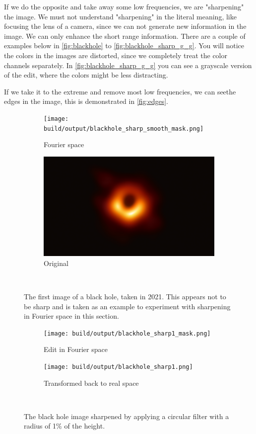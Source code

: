 \FloatBarrier

If we do the opposite and take away some low frequencies, we are "sharpening" the image.
We must not understand "sharpening" in the literal meaning, like focusing the lens of a camera,
since we can not generate new information in the image. We can only enhance the short range information.
There are a couple of examples below in \autoref{fig:blackhole} to \autoref{fig:blackhole_sharp_g_g}.
You will notice the colors in the images are distorted, since we completely treat the
color channels separately. In \autoref{fig:blackhole_sharp_g_g} you can see a grayscale version
of the edit, where the colors might be less distracting.

If we take it to the extreme and remove most low frequencies, we can seethe edges in the image, this
is demonstrated in \autoref{fig:edges}.
\begin{figure}
    \centering
    \begin{subfigure}[h]{.49\linewidth}
        \centering
        \texttt{[image: build/output/blackhole\_sharp\_smooth\_mask.png]}
        \caption{Fourier space}
    \end{subfigure}
    \begin{subfigure}[h]{.49\linewidth}
        \centering
        \includegraphics[width=.9\linewidth]{images/blackhole.png}
        \caption{Original}
    \end{subfigure}\
    \caption{The first image of a black hole, taken in 2021.
        This appears not to be sharp and is taken as an example to experiment with sharpening in Fourier space in this section. }
    \label{fig:blackhole}
\end{figure}
\begin{figure}
    \centering
    \begin{subfigure}[h]{.49\linewidth}
        \centering
        \texttt{[image: build/output/blackhole\_sharp1\_mask.png]}
        \caption{Edit in Fourier space}
    \end{subfigure}
    \begin{subfigure}[h]{.49\linewidth}
        \centering
        \texttt{[image: build/output/blackhole\_sharp1.png]}
        \caption{Transformed back to real space}
    \end{subfigure}\
    \caption{The black hole image sharpened by applying a circular filter with a radius of 1\% of the height.}
    \label{fig:blackhole_sharp}
\end{figure}
